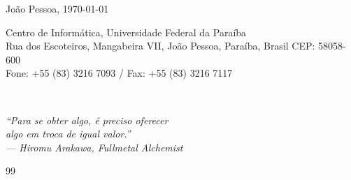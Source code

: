 \documentclass{tcc}
\begin{document}
\vfill
\begin{center}
João Pessoa, \today
\end{center}

\vspace{0.05in}

\begin{center}
\footnotesize{ Centro de Informática, Universidade Federal da Paraíba\\
Rua dos Escoteiros, Mangabeira VII, João Pessoa, Paraíba, Brasil CEP: 58058-600\\
Fone: +55 (83) 3216 7093 / Fax: +55 (83) 3216 7117}
\end{center}
\paginaembranco
\newpage
$ $
\vfill

\begin{flushright}
\em ``Para se obter algo, é preciso oferecer\\algo em troca de igual valor.''\\--- Hiromu Arakawa, Fullmetal Alchemist
\end{flushright}

\paginaembranco

\newpage

%




\newpage


\newpage



\newpage

\renewcommand{\listfigurename}{\centering LISTA DE FIGURAS}
\listoffigures
\newpage


\listofquadros
\newpage



\newpage


\pagestyle{plain} %
\renewcommand{\contentsname}{\centering SUMÁRIO}
\tableofcontents

\newpage






\renewcommand{\refname}{\centering REFERÊNCIAS} %
\begin{thebibliography}{99}

\end{thebibliography}


\end{document}
